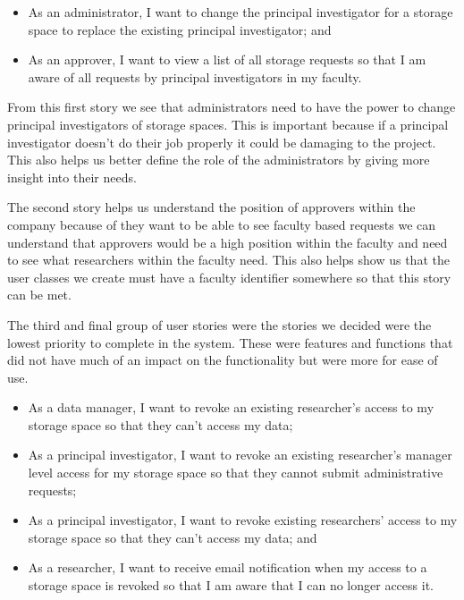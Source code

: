 \documentclass[a4paper,titlepage,12pt]{article}
\begin{document}
\begin{itemize}
	\item As an administrator, I want to change the principal investigator
	      for a storage space to replace the existing principal
	      investigator; and
	\item As an approver, I want to view a list of all storage requests so
	      that I am aware of all requests by principal investigators in my
	      faculty.
\end{itemize}

From this first story we see that administrators need to have the power to
change principal investigators of storage spaces. This is important because if
a principal investigator doesn't do their job properly it could be damaging to
the project. This also helps us better define the role of the administrators by
giving more insight into their needs.

The second story helps us understand the position of approvers within the
company because of they want to be able to see faculty based requests we can
understand that approvers would be a high position within the faculty and need
to see what researchers within the faculty need. This also helps show us that
the user classes we create must have a faculty identifier somewhere so that
this story can be met.

The third and final group of user stories were the stories we decided were the
lowest priority to complete in the system. These were features and functions
that did not have much of an impact on the functionality but were more for ease
of use.

\begin{itemize}
	\item As a data manager, I want to revoke an existing researcher's
	      access to my storage space so that they can't access my data;
	\item As a principal investigator, I want to revoke an existing
	      researcher's manager level access for my storage space so that
	      they cannot submit administrative requests;
	\item As a principal investigator, I want to revoke existing
	      researchers' access to my storage space so that they can't access
	      my data; and
	\item As a researcher, I want to receive email notification when my
	      access to a storage space is revoked so that I am aware that I
	      can no longer access it.
\end{itemize}
\end{document}
